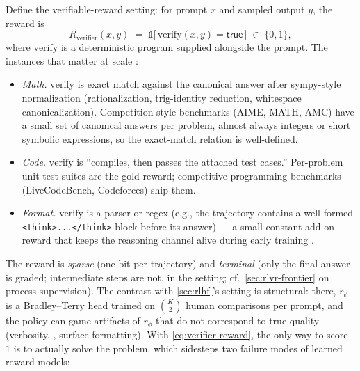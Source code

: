 Define the verifiable-reward setting: for prompt $x$ and sampled output
$y$, the reward is
\begin{equation}
R_{\mathrm{verifier}}(x, y) \;=\; \mathbb{1}\big[\,\mathrm{verify}(x, y) = \mathsf{true}\,\big] \;\in\; \{0, 1\},
\label{eq:verifier-reward}
\end{equation}
where $\mathrm{verify}$ is a deterministic program supplied alongside
the prompt. The instances that matter at scale
\citep[\S 2.2]{deepseek-r1}:

\begin{itemize}
\item \emph{Math.} $\mathrm{verify}$ is exact match against the canonical
answer after sympy-style normalization (rationalization,
trig-identity reduction, whitespace canonicalization). Competition-style
benchmarks (AIME, MATH, AMC) have a small set of canonical answers per
problem, almost always integers or short symbolic expressions, so the
exact-match relation is well-defined.
\item \emph{Code.} $\mathrm{verify}$ is ``compiles, then passes the
attached test cases.'' Per-problem unit-test suites are the gold reward;
competitive programming benchmarks (LiveCodeBench, Codeforces) ship
them.
\item \emph{Format.} $\mathrm{verify}$ is a parser or regex (e.g., the
trajectory contains a well-formed \texttt{<think>}\allowbreak\texttt{...</think>} block before its answer) — a small constant
add-on reward that keeps the reasoning channel alive during early
training \citep[\S 2.2]{deepseek-r1}.
\end{itemize}

The reward is \emph{sparse} (one bit per trajectory) and \emph{terminal}
(only the final answer is graded; intermediate steps are not, in the
 setting; cf.\ \cref{sec:rlvr-frontier} on process supervision). The
contrast with \cref{sec:rlhf}'s  setting is structural: there,
$r_\phi$ is a Bradley--Terry head trained on $\binom{K}{2}$ human
comparisons per prompt, and the policy can game artifacts of $r_\phi$
that do not correspond to true quality (verbosity, , surface
formatting). With \cref{eq:verifier-reward}, the only way to score $1$
is to actually solve the problem, which sidesteps two failure modes of
learned reward models:

